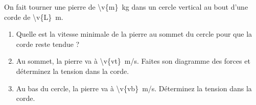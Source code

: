 On fait tourner une pierre de \qty{\v{m}}{kg} dans un cercle vertical au bout d'une corde de \qty{\v{L}}{m}.

\begin{enumerate}[label=\alph*)]
    \item Quelle est la vitesse minimale de la pierre au sommet du cercle pour que la corde reste tendue ?
    \item Au sommet, la pierre va à \qty{\v{vt}}{m/s}. Faites son diagramme des forces et déterminez la tension dans la corde.
    \item Au bas du cercle, la pierre va à \qty{\v{vb}}{m/s}. Déterminez la tension dans la corde.
\end{enumerate}
